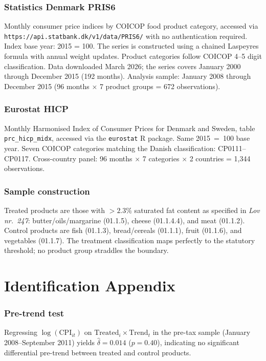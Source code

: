 \documentclass[12pt]{article}
\begin{document}
\subsubsection*{Statistics Denmark PRIS6} Monthly consumer price indices by COICOP food product category, accessed via \texttt{https://api.statbank.dk/v1/data/PRIS6/} with no authentication required. Index base year: 2015 = 100. The series is constructed using a chained Laspeyres formula with annual weight updates. Product categories follow COICOP 4--5 digit classification. Data downloaded March 2026; the series covers January 2000 through December 2015 (192 months). Analysis sample: January 2008 through December 2015 (96 months $\times$ 7 product groups = 672 observations).

\subsubsection*{Eurostat HICP} Monthly Harmonised Index of Consumer Prices for Denmark and Sweden, table \texttt{prc\_hicp\_midx}, accessed via the \texttt{eurostat} R package. Same 2015~=~100 base year. Seven COICOP categories matching the Danish classification: CP0111--CP0117. Cross-country panel: 96 months $\times$ 7 categories $\times$ 2 countries = 1,344 observations.

\subsubsection*{Sample construction} Treated products are those with $>2.3\%$ saturated fat content as specified in \textit{Lov nr.\ 247}: butter/oils/margarine (01.1.5), cheese (01.1.4.4), and meat (01.1.2). Control products are fish (01.1.3), bread/cereals (01.1.1), fruit (01.1.6), and vegetables (01.1.7). The treatment classification maps perfectly to the statutory threshold; no product group straddles the boundary.

\section{Identification Appendix}

\subsubsection*{Pre-trend test} Regressing $\log(\text{CPI}_{it})$ on $\text{Treated}_i \times \text{Trend}_t$ in the pre-tax sample (January 2008--September 2011) yields $\hat{\delta} = 0.014$ ($p = 0.40$), indicating no significant differential pre-trend between treated and control products.
\end{document}
